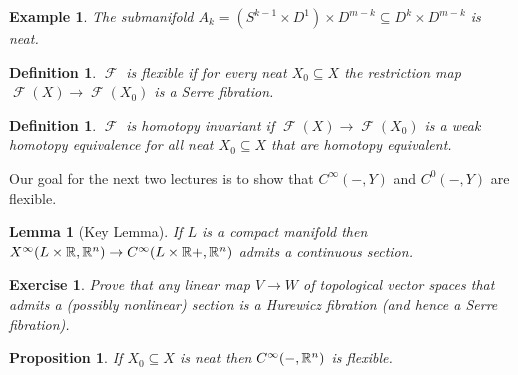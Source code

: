 \documentclass{article}
\newtheorem{proposition}[theorem]{Proposition}
\newtheorem{lemma}[theorem]{Lemma}
\newtheorem{definition}[theorem]{Definition}
\newtheorem{example}[theorem]{Example}
\newtheorem{exercise}[theorem]{Exercise}
\newtheorem{proposed work}[theorem]{Proposed Work}
\DeclareMathOperator{\CF}{\mathcal F}
\begin{document}
\begin{example}
  The submanifold $A_k = (S^{k-1}\times D^1) \times D^{m-k} \subseteq
  D^k\times D^{m-k}$ is neat.
\end{example}

\begin{definition} \label{def:flexible}
  $\CF$ is {\em flexible} if for every neat $X_0\subseteq X$ the
  restriction map $\CF(X)\to \CF(X_0)$ is a Serre fibration.
\end{definition}

\begin{definition} \label{def:htpyinvt}
  $\CF$ is {\em homotopy invariant} if $\CF(X) \to \CF(X_0)$ is a weak
  homotopy equivalence for all neat $X_0\subseteq X$ that are homotopy
  equivalent. 
\end{definition}

Our goal for the next two lectures is to show that $C^\infty(-,Y)$ and
$C^0(-, Y)$ are flexible.

\begin{lemma}[Key Lemma] \label{lem:compactmapstoRn}
  If $L$ is a compact manifold then $X^\infty(L\times\mathbb R, \mathbb R^n) \to
  C^\infty(L\times \mathbb R+, \mathbb R^n)$ admits a continuous section. 
\end{lemma}

\begin{exercise} \label{ex:vectorspacesection} Prove that any linear
  map $V\to W$ of topological vector spaces that admits a (possibly
  nonlinear) section is a Hurewicz fibration (and hence a Serre
  fibration).
\end{exercise}

\begin{proposition} \label{prop:mapstoRn}
  If $X_0\subseteq X$ is neat then $C^\infty(-, \mathbb R^n)$ is flexible.
\end{proposition}
\end{document}
